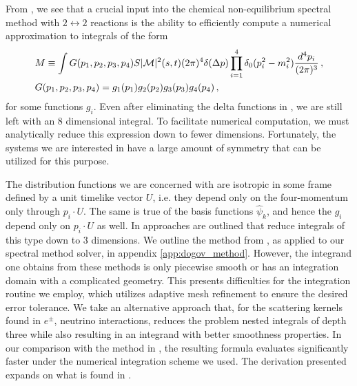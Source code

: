 From , we see that a crucial input into the chemical non-equilibrium spectral method with $2 \leftrightarrow 2$ reactions is the ability to efficiently compute a numerical approximation to integrals of the form
\begin{align}\label{coll_ip}
&M\equiv\int G(p_1,p_2,p_3,p_4) S |\mathcal{M}|^2(s,t) (2\pi)^4\delta(\Delta p)\prod_{i=1}^4 \delta_0(p_i^2-m_i^2)\frac{d^4p_i}{(2\pi)^3}\,,\\
&G(p_1,p_2,p_3,p_4)=g_1(p_1)g_2(p_2)g_3(p_3)g_4(p_4)\,,\notag
\end{align}
for some functions $g_i$. Even after eliminating the delta functions in , we are still left with an $8$ dimensional integral.  To facilitate numerical computation, we must analytically reduce this expression down to fewer dimensions.  Fortunately, the systems we are interested in have a large amount of symmetry that  can be utilized for this purpose.  

The distribution functions we are concerned with are isotropic in some frame defined  by a unit timelike vector $U$, i.e. they depend only on the four-momentum only through $p_i\cdot U$.  The same is true of the basis functions $\hat\psi_k$, and hence the  $g_i$ depend only on $p_i\cdot U$ as well.  In \cite{Madsen,Dolgov_Hansen} approaches are outlined that reduce integrals of this type down to $3$ dimensions.  We outline the method from \cite{Dolgov_Hansen}, as applied to our spectral method solver, in appendix \ref{app:dogov_method}.  However, the integrand one obtains from these methods is only piecewise smooth or has an integration domain with a complicated geometry.  This presents difficulties for the integration routine we employ, which utilizes adaptive mesh refinement to ensure the desired error tolerance.  We take an alternative approach that, for the scattering kernels found in $e^\pm$, neutrino interactions, reduces the problem nested integrals  of depth three while also resulting in an integrand with better smoothness properties.  In our comparison with the method in \cite{Dolgov_Hansen}, the resulting formula evaluates significantly faster under the numerical integration scheme we used.   The derivation presented expands on what is found in \cite{letessier2002hadrons}.

